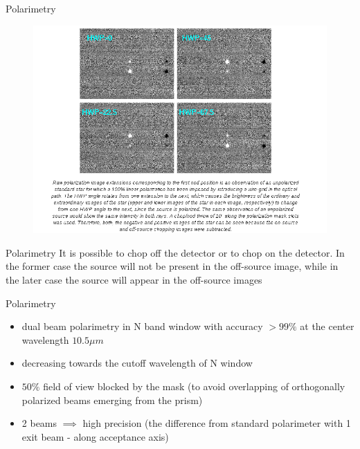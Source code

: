 \documentclass{beamer}
\begin{document}
\begin{frame}{Polarimetry}
\begin{figure}[H]
 \centering
 \includegraphics[scale=0.35]{img6.png}
\end{figure}
\end{frame}


\begin{frame}{Polarimetry}
It is possible to chop off the detector or to chop on the detector. In the former case the source will not be present in the off-source image, while in the later case the source will appear in the off-source images
\end{frame}


\begin{frame}{Polarimetry}



\begin{itemize}
\item dual beam polarimetry  in N band window with accuracy $> 99\%$ at the center wavelength $10.5 \mu m$
\item decreasing towards the cutoff wavelength of N window
\item $50\%$ field of view blocked by the mask (to avoid overlapping of orthogonally polarized beams emerging from the prism)
\item 2 beams $\implies$ high precision (the difference from standard polarimeter with 1 exit beam - along acceptance axis)
\end{itemize}
\end{frame}
\end{document}
